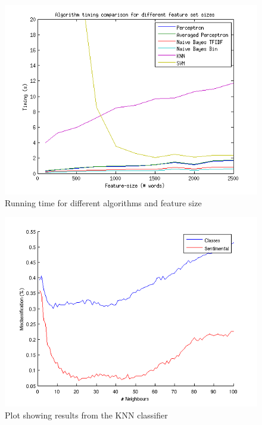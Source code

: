 \begin{figure}[H]
\centering
\includegraphics[scale =  1]{../Plottar/feature_size_TIMING.png}
\caption{Running time for different algorithms and feature size}
\end{figure} 

\begin{figure}[H]
\centering
\includegraphics[scale = 1]{../Plottar/knn_2000words_testdata100_unigram.png}
\caption{Plot showing results from the KNN classifier}
\end{figure} 


